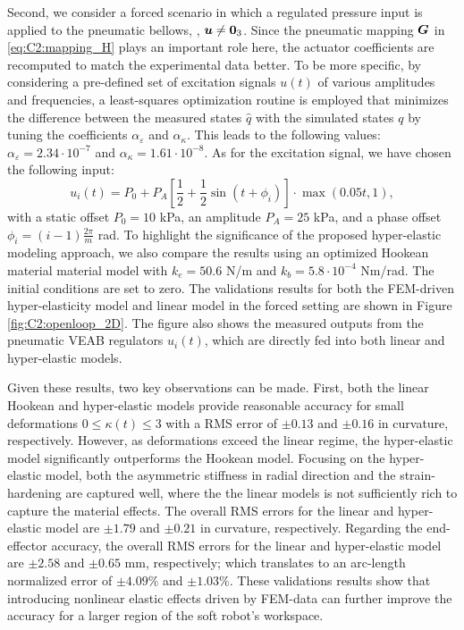 Second, we consider a forced scenario in which a regulated pressure input is applied to the pneumatic bellows, \ie, ${\boldsymbol{u}} \neq \boldsymbol{0}_3$. Since the pneumatic mapping $\boldsymbol{G}$ in \eqref{eq:C2:mapping_H} plays an important role here, the actuator coefficients are recomputed to match the experimental data better. To be more specific, by considering a pre-defined set of excitation signals $u(t)$ of various amplitudes and frequencies, a least-squares optimization routine is employed that minimizes the difference between the measured states $\hat{q}$ with the simulated states ${q}$ by tuning the coefficients $\alpha_\varepsilon$ and $\alpha_\kappa$. This leads to the following values: $\alpha_\varepsilon = 2.34\cdot 10^{-7}$ and $\alpha_\kappa =  1.61\cdot 10^{-8}$. As for the excitation signal, we have chosen the following input:
%
\begin{equation}
u_i(t) = P_0 + P_A \left[\frac{1}{2} + \frac{1}{2}\sin(t + \phi_i) \right]\cdot \max(0.05t,1),
\end{equation}
%
with a static offset $P_0 = 10$ kPa, an amplitude $P_A = 25$ kPa, and a phase offset $\phi_i = (i-1)\frac{2\pi}{m}$ rad. To highlight the significance of the proposed hyper-elastic modeling approach, we also compare the results using an optimized Hookean material material model with $k_e = 50.6$ N/m and $k_b = 5.8\cdot 10^{-4}$ Nm/rad. The initial conditions are set to zero. The validations results for both the FEM-driven hyper-elasticity model and linear model in the forced setting are shown in Figure \ref{fig:C2:openloop_2D}. The figure also shows the measured outputs from the pneumatic VEAB regulators $u_i(t)$, which are directly fed into both linear and hyper-elastic models. %

Given these results, two key observations can be made. First, both the linear Hookean and hyper-elastic models provide reasonable accuracy for small deformations $0 \le \kappa(t) \le 3$ with a RMS error of $\pm0.13$ and $\pm0.16$ in curvature, respectively. However, as deformations exceed the linear regime, the hyper-elastic model significantly outperforms the Hookean model. Focusing on the hyper-elastic model, both the asymmetric stiffness in radial direction and the strain-hardening are captured well, where the the linear models is not sufficiently rich to capture the material effects. The overall RMS errors for the linear and hyper-elastic model are $\pm1.79$ and $\pm0.21$ in curvature, respectively. Regarding the end-effector accuracy, the overall RMS errors for the linear and hyper-elastic model are $\pm2.58$ and $\pm0.65$ mm, respectively; which translates to an arc-length normalized error of $\pm4.09\%$ and $\pm1.03\%$. These validations results show that introducing nonlinear elastic effects driven by FEM-data can further improve the accuracy for a larger region of the soft robot's workspace.

